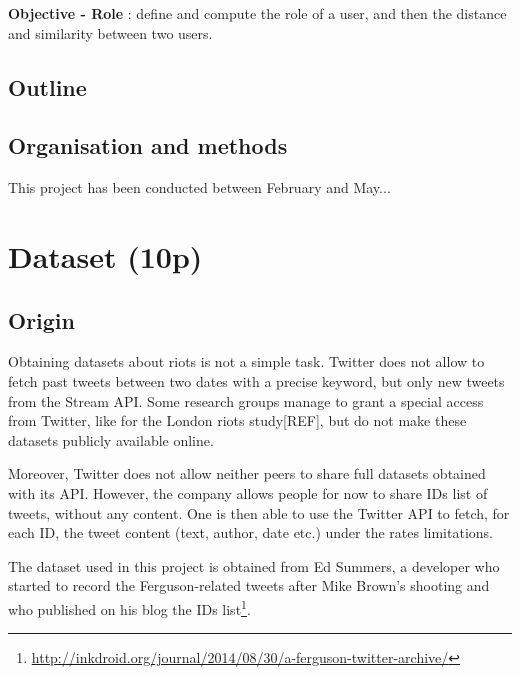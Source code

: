 \documentclass[a4paper,12pt]{report}
\begin{document}
\begin{objbox}\color{Maroon}
\textbf{Objective - Role} : define and compute the role of a user, and then the distance and similarity between two users.
\end{objbox}

\newpage
\section{Outline}

\newpage

\section{Organisation and methods}

This project has been conducted between February and May...



\chapter{Dataset (10p)}

\section{Origin}
Obtaining datasets about riots is not a simple task. Twitter does not allow to fetch past tweets between two dates with a precise keyword, but only new tweets from the Stream API. Some research groups manage to grant a special access from Twitter, like for the London riots study[REF], but do not make these datasets publicly available online.

Moreover, Twitter does not allow neither peers to share full datasets obtained with its API. However, the company allows people for now to share IDs list of tweets, without any content. One is then able to use the Twitter API to fetch, for each ID, the tweet content (text, author, date etc.) under the rates limitations.

The dataset used in this project is obtained from Ed Summers, a developer who started to record the Ferguson-related tweets after Mike Brown's shooting and who published on his blog the IDs list\footnote{\url{http://inkdroid.org/journal/2014/08/30/a-ferguson-twitter-archive/}}.
\end{document}
